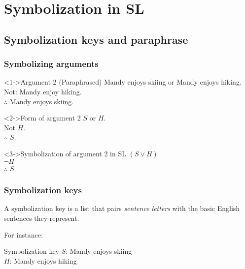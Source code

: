 ﻿%

\setcounter{section}{0}


\section{Symbolization in SL}
\subsection{Symbolization keys and paraphrase}

\begin{frame}
  \frametitle{Symbolizing arguments}

  \begin{block}<1->{Argument 2 (Paraphrased)}
    Mandy enjoys skiing or Mandy enjoys hiking.\\
    Not: Mandy enjoy hiking.\\
    $\therefore$ Mandy enjoys skiing.
  \end{block}

  \begin{block}<2->{Form of argument 2}
    $S$ or $H$.\\
    Not $H$.\\
    $\therefore$ $S$.
  \end{block}

  \begin{block}<3->{Symbolization of argument 2 in SL}
    $(S \lor H)$\\
    $\lnot H$\\
    $\therefore$ $S$
  \end{block}

\end{frame}

\begin{frame}
  \frametitle{Symbolization keys}

  \begin{definition}
    A symbolization key is a list that pairs \emph{sentence letters} with
    the basic English sentences they represent.
  \end{definition}

  For instance:

  \begin{block}{Symbolization key}
    $S$: Mandy enjoys skiing\\
    $H$: Mandy enjoys hiking
  \end{block}

\end{frame}

